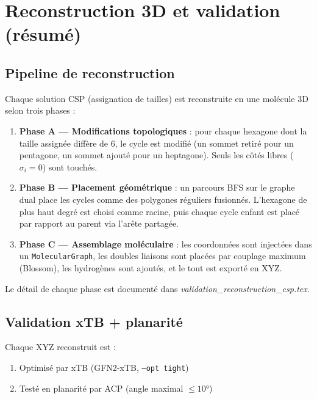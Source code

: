 \section{Reconstruction 3D et validation (résumé)}

\subsection{Pipeline de reconstruction}

Chaque solution CSP (assignation de tailles) est reconstruite en une molécule 3D selon
trois phases :

\begin{enumerate}
  \item \textbf{Phase A — Modifications topologiques} : pour chaque hexagone dont la taille
    assignée diffère de 6, le cycle est modifié (un sommet retiré pour un pentagone, un sommet
    ajouté pour un heptagone). Seuls les côtés libres ($\sigma_i = 0$) sont touchés.

  \item \textbf{Phase B — Placement géométrique} : un parcours BFS sur le graphe dual place
    les cycles comme des polygones réguliers fusionnés. L'hexagone de plus haut degré est
    choisi comme racine, puis chaque cycle enfant est placé par rapport au parent via l'arête
    partagée.

  \item \textbf{Phase C — Assemblage moléculaire} : les coordonnées sont injectées dans un
    \texttt{MolecularGraph}, les doubles liaisons sont placées par couplage maximum (Blossom),
    les hydrogènes sont ajoutés, et le tout est exporté en XYZ.
\end{enumerate}

Le détail de chaque phase est documenté dans \textit{validation\_reconstruction\_csp.tex}.

\subsection{Validation xTB + planarité}

Chaque XYZ reconstruit est :
\begin{enumerate}
  \item Optimisé par xTB (GFN2-xTB, \texttt{--opt tight})
  \item Testé en planarité par ACP (angle maximal $\leq 10°$)
\end{enumerate}

